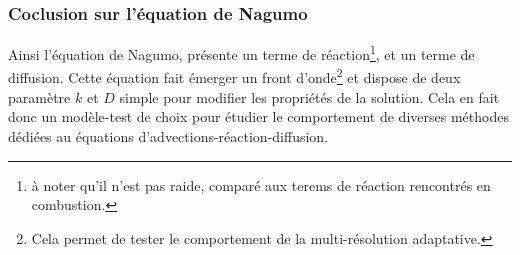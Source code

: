 \subsubsection{Coclusion sur l'équation de Nagumo}
Ainsi l'équation de Nagumo, présente un terme de réaction\footnote{à noter qu'il n'est pas raide, comparé aux terems de réaction rencontrés en combustion.},
et un terme de diffusion. Cette équation fait émerger un front d'onde\footnote{Cela permet de tester le comportement de la multi-résolution adaptative.} et dispose de deux paramètre $k$ et $D$ simple pour modifier les propriétés de la solution. 
Cela en fait donc un modèle-test de choix pour étudier le comportement de diverses méthodes dédiées au équations d'advections-réaction-diffusion. 